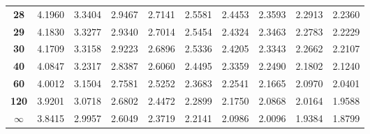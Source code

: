 \begin{center}
\begin{tabular}{c|c|c|c|c|c|c|c|c|c}
\textbf{28}  & 4.1960     & 3.3404     & 2.9467     & 2.7141     & 2.5581     & 2.4453     & 2.3593     & 2.2913     & 2.2360           \\
\textbf{29}  & 4.1830     & 3.3277     & 2.9340     & 2.7014     & 2.5454     & 2.4324     & 2.3463     & 2.2783     & 2.2229          \\
\textbf{30}  & 4.1709     & 3.3158     & 2.9223     & 2.6896     & 2.5336     & 2.4205     & 2.3343     & 2.2662     & 2.2107        \\
\textbf{40}  & 4.0847     & 3.2317     & 2.8387     & 2.6060     & 2.4495     & 2.3359     & 2.2490     & 2.1802     & 2.1240         \\
\textbf{60}  & 4.0012     & 3.1504     & 2.7581     & 2.5252     & 2.3683     & 2.2541     & 2.1665     & 2.0970     & 2.0401       \\
\textbf{120} & 3.9201     & 3.0718     & 2.6802     & 2.4472     & 2.2899     & 2.1750     & 2.0868     & 2.0164     & 1.9588        \\
\textbf{$\infty$}   & 3.8415     & 2.9957     & 2.6049     & 2.3719     & 2.2141     & 2.0986     & 2.0096     & 1.9384     & 1.8799     \bstrut \\
\hline
\end{tabular}
\end{center}
